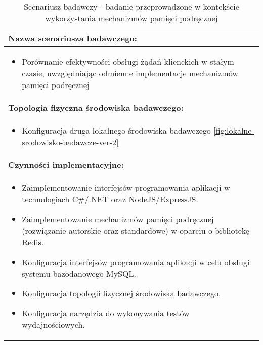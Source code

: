 \setlength{\LTcapwidth}{\textwidth}
\setlength\LTleft{0pt}
\setlength\LTright{0pt}
\begin{longtable}[c]{|llll|}
    \caption{Scenariusz badawczy - badanie przeprowadzone w kontekście wykorzystania mechanizmów pamięci podręcznej}
    \label{tab:research-scenario-5}                                                  \\ \hline
    \multicolumn{4}{|l|}{\textbf{Nazwa scenariusza badawczego:}}                     \\ \hline
    \multicolumn{4}{|p{\linewidth}|}{
        \begin{itemize}[label={}]
            \item Porównanie efektywności obsługi żądań klienckich w stałym czasie, uwzględniając odmienne implementacje mechanizmów pamięci podręcznej
          \end{itemize}
    } \\ \hline
    \multicolumn{4}{|l|}{\textbf{Topologia fizyczna środowiska badawczego:}}         \\ \hline
    \multicolumn{4}{|p{\linewidth}|}{
        \begin{itemize}[label={}]
            \item Konfiguracja druga lokalnego środowiska badawczego \ref{fig:lokalne-srodowisko-badawcze-ver-2}
          \end{itemize}
    }\\ \hline
    \multicolumn{4}{|l|}{\textbf{Czynności implementacyjne:}}                        \\ \hline
    \multicolumn{4}{|p{\linewidth}|}{
        \begin{itemize}
            \item Zaimplementowanie interfejsów programowania aplikacji w technologiach C\#/.NET oraz NodeJS/ExpressJS.
            \item Zaimplementowanie mechanizmów pamięci podręcznej (rozwiązanie autorskie oraz standardowe) w oparciu o bibliotekę Redis.
            \item Konfiguracja interfejsów programowania aplikacji w celu obsługi systemu bazodanowego MySQL.
            \item Konfiguracja topologii fizycznej środowiska badawczego.
            \item Konfiguracja narzędzia do wykonywania testów wydajnościowych.
        \end{itemize}}                                                           \\ \hline

\end{longtable}
